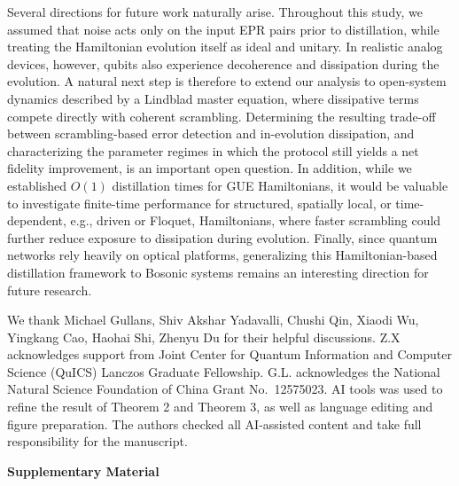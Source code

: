 \documentclass[onecolumn,prx,longbibliography,nofootinbib, superscriptaddress]{revtex4-2}
\theoremstyle{recap}
\begin{document}
Several directions for future work naturally arise. Throughout this study, we assumed that noise acts only on the input EPR pairs prior to distillation, while treating the Hamiltonian evolution itself as ideal and unitary. In realistic analog devices, however, qubits also experience decoherence and dissipation during the evolution. A natural next step is therefore to extend our analysis to open-system dynamics described by a Lindblad master equation, where dissipative terms compete directly with coherent scrambling. Determining the resulting trade-off between scrambling-based error detection and in-evolution dissipation, and characterizing the parameter regimes in which the protocol still yields a net fidelity improvement, is an important open question. In addition, while we established $O(1)$ distillation times for GUE Hamiltonians, it would be valuable to investigate finite-time performance for structured, spatially local, or time-dependent, e.g., driven or Floquet, Hamiltonians, where faster scrambling could further reduce exposure to dissipation during evolution. Finally, since quantum networks rely heavily on optical platforms, generalizing this Hamiltonian-based distillation framework to Bosonic systems remains an interesting direction for future research.

\acknowledgments
We thank Michael Gullans, Shiv Akshar Yadavalli, Chushi Qin, Xiaodi Wu, Yingkang Cao, Haohai Shi, Zhenyu Du for their helpful discussions. Z.X acknowledges support from Joint Center for Quantum Information and Computer Science (QuICS) Lanczos Graduate Fellowship. G.L. acknowledges the National Natural Science Foundation of China Grant No.~12575023. AI tools was used to refine the result of Theorem 2 and Theorem 3, as well as language editing and figure preparation. The authors checked all AI-assisted content and take full responsibility for the manuscript.


\nocite{forceTitles}

%
%
%




\clearpage

\appendix

\onecolumngrid
\begin{center}
\textbf{\large Supplementary Material }
\end{center}
\end{document}

